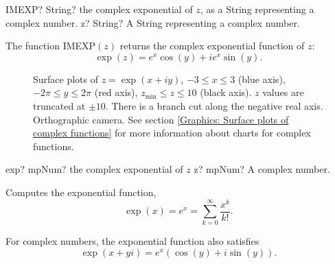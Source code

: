 \vspace{0.6cm}
\begin{mpFunctionsExtract}
	\mpWorksheetFunctionOneNotImplemented
	{IMEXP? String? the complex exponential of $z$, as a String representing a complex number.}
	{z? String? A String representing a complex number.}
\end{mpFunctionsExtract}

\vspace{0.3cm}
The function \textsf{IMEXP$(z)$} returns the complex exponential function of $z$: 
\begin{equation}
	\exp(z) = e^x \cos(y) + i e^x \sin(y).
\end{equation}


\begin{figure}[ht]%
	\centering
	\qquad
	\caption[Complex Exponential Function]{Surface plots of $z = \exp(x + iy)$, $-3 \leq x \leq 3$ (blue axis), $-2 \pi \leq y \leq 2\pi$ (red axis), $z_{\text{min}} \leq z \leq 10$ (black axis). $z$ values are truncated at $\pm 10$. There is a branch cut along the negative real axis. Orthographic camera. See section \ref{Graphics: Surface plots of complex functions} for more information about charts for complex functions.} 
	\label{fig:Complex Exponential Function}%
\end{figure}


\begin{mpFunctionsExtract}
	\mpFunctionOne
	{exp? mpNum? the complex exponential of $z$}
	{z? mpNum? A complex number.}
\end{mpFunctionsExtract}


Computes the exponential function,
\begin{equation}
	\exp(x) = e^x = \sum_{k=0}^{\infty} \frac{x^k}{k!}.
\end{equation}

For complex numbers, the exponential function also satisfies
\begin{equation}
	\exp(x+yi) = e^x (\cos(y) + i \sin(y)).
\end{equation}


